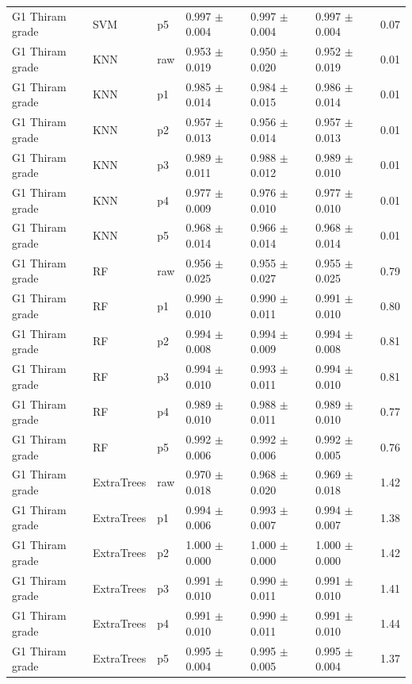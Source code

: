 {\begin{longtable}{L{2.35cm}L{2.4cm}L{1.0cm}L{2.35cm}L{2.25cm}L{2.25cm}L{1.45cm}}
G1 Thiram grade & SVM & p5 & 0.997 $\pm$ 0.004 & 0.997 $\pm$ 0.004 & 0.997 $\pm$ 0.004 & 0.07 \\
G1 Thiram grade & KNN & raw & 0.953 $\pm$ 0.019 & 0.950 $\pm$ 0.020 & 0.952 $\pm$ 0.019 & 0.01 \\
G1 Thiram grade & KNN & p1 & 0.985 $\pm$ 0.014 & 0.984 $\pm$ 0.015 & 0.986 $\pm$ 0.014 & 0.01 \\
G1 Thiram grade & KNN & p2 & 0.957 $\pm$ 0.013 & 0.956 $\pm$ 0.014 & 0.957 $\pm$ 0.013 & 0.01 \\
G1 Thiram grade & KNN & p3 & 0.989 $\pm$ 0.011 & 0.988 $\pm$ 0.012 & 0.989 $\pm$ 0.010 & 0.01 \\
G1 Thiram grade & KNN & p4 & 0.977 $\pm$ 0.009 & 0.976 $\pm$ 0.010 & 0.977 $\pm$ 0.010 & 0.01 \\
G1 Thiram grade & KNN & p5 & 0.968 $\pm$ 0.014 & 0.966 $\pm$ 0.014 & 0.968 $\pm$ 0.014 & 0.01 \\
G1 Thiram grade & RF & raw & 0.956 $\pm$ 0.025 & 0.955 $\pm$ 0.027 & 0.955 $\pm$ 0.025 & 0.79 \\
G1 Thiram grade & RF & p1 & 0.990 $\pm$ 0.010 & 0.990 $\pm$ 0.011 & 0.991 $\pm$ 0.010 & 0.80 \\
G1 Thiram grade & RF & p2 & 0.994 $\pm$ 0.008 & 0.994 $\pm$ 0.009 & 0.994 $\pm$ 0.008 & 0.81 \\
G1 Thiram grade & RF & p3 & 0.994 $\pm$ 0.010 & 0.993 $\pm$ 0.011 & 0.994 $\pm$ 0.010 & 0.81 \\
G1 Thiram grade & RF & p4 & 0.989 $\pm$ 0.010 & 0.988 $\pm$ 0.011 & 0.989 $\pm$ 0.010 & 0.77 \\
G1 Thiram grade & RF & p5 & 0.992 $\pm$ 0.006 & 0.992 $\pm$ 0.006 & 0.992 $\pm$ 0.005 & 0.76 \\
G1 Thiram grade & ExtraTrees & raw & 0.970 $\pm$ 0.018 & 0.968 $\pm$ 0.020 & 0.969 $\pm$ 0.018 & 1.42 \\
G1 Thiram grade & ExtraTrees & p1 & 0.994 $\pm$ 0.006 & 0.993 $\pm$ 0.007 & 0.994 $\pm$ 0.007 & 1.38 \\
G1 Thiram grade & ExtraTrees & p2 & 1.000 $\pm$ 0.000 & 1.000 $\pm$ 0.000 & 1.000 $\pm$ 0.000 & 1.42 \\
G1 Thiram grade & ExtraTrees & p3 & 0.991 $\pm$ 0.010 & 0.990 $\pm$ 0.011 & 0.991 $\pm$ 0.010 & 1.41 \\
G1 Thiram grade & ExtraTrees & p4 & 0.991 $\pm$ 0.010 & 0.990 $\pm$ 0.011 & 0.991 $\pm$ 0.010 & 1.44 \\
G1 Thiram grade & ExtraTrees & p5 & 0.995 $\pm$ 0.004 & 0.995 $\pm$ 0.005 & 0.995 $\pm$ 0.004 & 1.37 \\

\end{longtable}}
